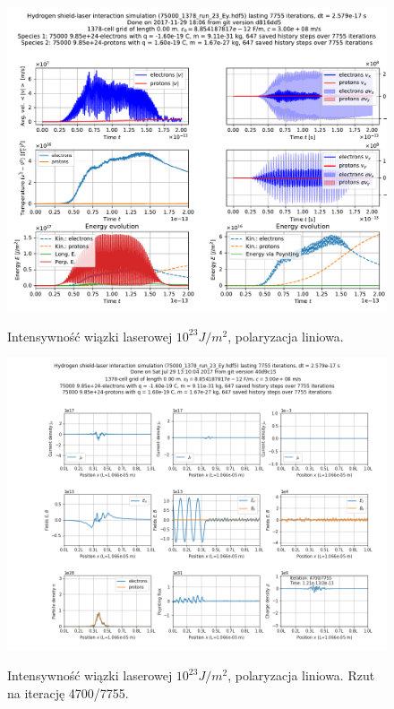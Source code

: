 \begin{figure}[h!]
  \includegraphics[width=\textwidth]{Images/75000_1378_run_23_Ey}
  \label{fig:laser-23-Ey}
  \caption{Intensywność wiązki laserowej $10^{23} J/m^2$, polaryzacja liniowa.}
\end{figure}

\begin{figure}[h!]
  \includegraphics[width=\textwidth]{Images/75000_1378_run_23_Ey_004700}
  \label{fig:laser-23-Ey-snapshot}
  \caption{Intensywność wiązki laserowej $10^{23} J/m^2$, polaryzacja liniowa. Rzut na iterację 4700/7755.}
\end{figure}


